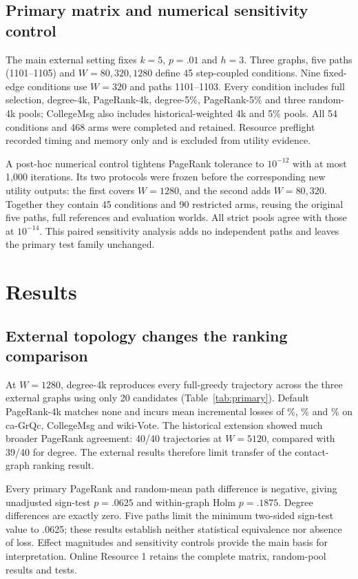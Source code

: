 \documentclass[smallextended]{svjour3}
\begin{document}
\subsection{Primary matrix and numerical sensitivity control}
The main external setting fixes $k=5$, $p=.01$ and $h=3$. Three graphs, five paths (1101--1105) and $W=80,320,1280$ define 45 step-coupled conditions. Nine fixed-edge conditions use $W=320$ and paths 1101--1103. Every condition includes full selection, degree-4k, PageRank-4k, degree-5\%, PageRank-5\% and three random-4k pools; CollegeMsg also includes historical-weighted 4k and 5\% pools. All 54 conditions and 468 arms were completed and retained. Resource preflight recorded timing and memory only and is excluded from utility evidence.

A post-hoc numerical control tightens PageRank tolerance to $10^{-12}$ with at most 1,000 iterations. Its two protocols were frozen before the corresponding new utility outputs: the first covers $W=1280$, and the second adds $W=80,320$. Together they contain 45 conditions and 90 restricted arms, reusing the original five paths, full references and evaluation worlds. All strict pools agree with those at $10^{-14}$. This paired sensitivity analysis adds no independent paths and leaves the primary test family unchanged.

\section{Results}
\subsection{External topology changes the ranking comparison}
At $W=1280$, degree-4k reproduces every full-greedy trajectory across the three external graphs using only 20 candidates (Table~\ref{tab:primary}). Default PageRank-4k matches none and incurs mean incremental losses of \GrqcPRLoss{}\%, \CollegePRLoss{}\% and \WikiPRLoss{}\% on ca-GrQc, CollegeMsg and wiki-Vote. The historical extension showed much broader PageRank agreement: 40/40 trajectories at $W=5120$, compared with 39/40 for degree. The external results therefore limit transfer of the contact-graph ranking result.


Every primary PageRank and random-mean path difference is negative, giving unadjusted sign-test $p=.0625$ and within-graph Holm $p=.1875$. Degree differences are exactly zero. Five paths limit the minimum two-sided sign-test value to .0625; these results establish neither statistical equivalence nor absence of loss. Effect magnitudes and sensitivity controls provide the main basis for interpretation. Online Resource 1 retains the complete matrix, random-pool results and tests.
\end{document}
